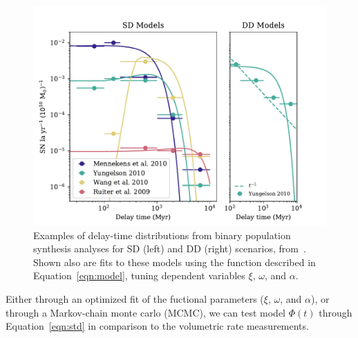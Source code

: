 \documentclass[apj]{aastex62}
\begin{document}
\begin{figure}[t]
   \centering
   \includegraphics[width=6.5in]{figure_sd_dd_fits}
   \caption{\footnotesize Examples of delay-time distributions from binary population synthesis analyses for SD (left) and DD (right) scenarios, from~\cite{Nelemans:2013}. Shown also are fits to these models using the function described in Equation~\ref{eqn:model}, tuning dependent variables $\xi$, $\omega$, and $\alpha$.}
   \label{fig:dtd_families}
\end{figure}

Either through an optimized fit of the fuctional parameters ($\xi$, $\omega$, and $\alpha$), or through a Markov-chain monte carlo (MCMC), we can test model $\Phi(t)$ through Equation~\ref{eqn:std} in comparison to the volumetric rate measurements.
\end{document}
